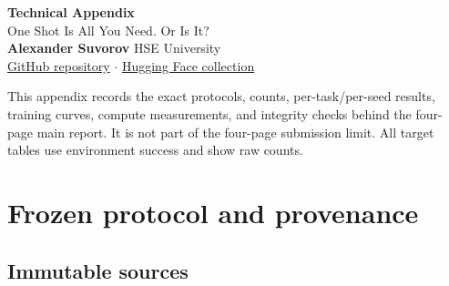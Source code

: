 \documentclass[9pt]{extarticle}
\begin{document}
\begin{center}
{\fontsize{22}{25}\selectfont\bfseries\color{ink} Technical Appendix}\\[2pt]
{\large One Shot Is All You Need. Or Is It?}\\[5pt]
{\normalsize\textbf{Alexander Suvorov} \quad HSE University}\\[5pt]
\href{https://github.com/alexsuw/smolvla-libero-fewshot}{GitHub repository}
\quad $\cdot$ \quad
\href{https://huggingface.co/collections/alexsuw/smolvla-libero-few-shot-6a8b009357482d2b4b9d3c2f}{Hugging Face collection}
\end{center}

\begin{center}
\colorbox{softblue}{\begin{minipage}{0.94\textwidth}
\small
This appendix records the exact protocols, counts, per-task/per-seed results,
training curves, compute measurements, and integrity checks behind the four-page
main report. It is not part of the four-page submission limit.
All target tables use environment success and show raw counts.
\end{minipage}}
\end{center}

\section{Frozen protocol and provenance}

\subsection{Immutable sources}
\end{document}
